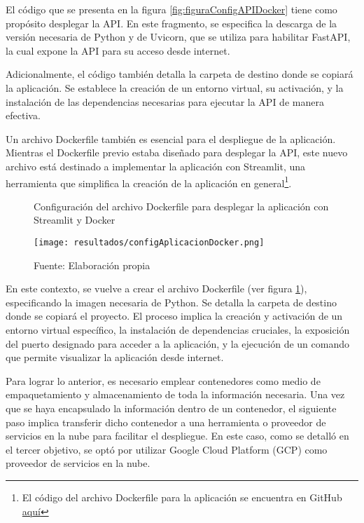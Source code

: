 El código que se presenta en la figura \ref{fig:figuraConfigAPIDocker} tiene como propósito desplegar la API. En este fragmento, se especifica la descarga de la versión necesaria de Python y de Uvicorn, que se utiliza para habilitar FastAPI, la cual expone la API para su acceso desde internet.\newline

Adicionalmente, el código también detalla la carpeta de destino donde se copiará la aplicación. Se establece la creación de un entorno virtual, su activación, y la instalación de las dependencias necesarias para ejecutar la API de manera efectiva. \newline

Un archivo Dockerfile también es esencial para el despliegue de la aplicación. Mientras el Dockerfile previo estaba diseñado para desplegar la API, este nuevo archivo está destinado a implementar la aplicación con Streamlit, una herramienta que simplifica la creación de la aplicación en general\footnote{El código del archivo Dockerfile para la aplicación se encuentra en GitHub \href{https://github.com/juferoto/mlops_project/tree/master/application/src/webapp}{aquí}}.

\newpage

\begin{figure}[h]
	\centering
	\caption{Configuración del archivo Dockerfile para desplegar la aplicación con Streamlit y Docker}
	\texttt{[image: resultados/configAplicacionDocker.png]}
	\caption*{\footnotesize Fuente: Elaboración propia}
	\label{fig:figuraConfigAplicacionDocker}
\end{figure}

En este contexto, se vuelve a crear el archivo Dockerfile (ver figura \ref{fig:figuraConfigAplicacionDocker}), especificando la imagen necesaria de Python. Se detalla la carpeta de destino donde se copiará el proyecto. El proceso implica la creación y activación de un entorno virtual específico, la instalación de dependencias cruciales, la exposición del puerto designado para acceder a la aplicación, y la ejecución de un comando que permite visualizar la aplicación desde internet. \newline

Para lograr lo anterior, es necesario emplear contenedores como medio de empaquetamiento y almacenamiento de toda la información necesaria. Una vez que se haya encapsulado la información dentro de un contenedor, el siguiente paso implica transferir dicho contenedor a una herramienta o proveedor de servicios en la nube para facilitar el despliegue. En este caso, como se detalló en el tercer objetivo, se optó por utilizar Google Cloud Platform (GCP) como proveedor de servicios en la nube. \newline

